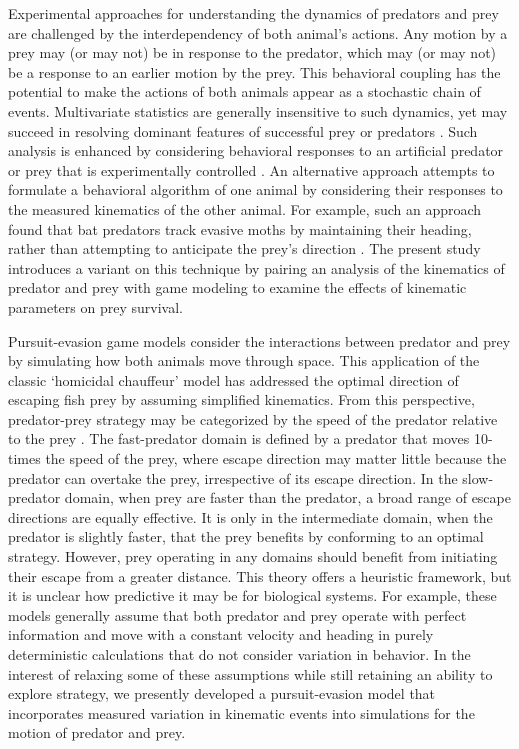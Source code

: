 \documentclass[]{rsos}%
\begin{document}
Experimental approaches for understanding the dynamics of predators and prey are challenged by the interdependency of both animal's actions.
Any motion by a prey may (or may not) be in response to the predator, which may (or may not) be a response to an earlier motion by the prey. 
This behavioral coupling has the potential to make the actions of both animals appear as a stochastic chain of events.
Multivariate statistics are generally insensitive to such dynamics, yet may succeed in resolving dominant features of successful prey \cite{Walker:2005vn} or predators \cite{Wainwright:2001ufa}.
Such analysis is enhanced by considering behavioral responses to an artificial predator or prey that is experimentally controlled \cite{Gabbiani:1999wz,Stewart:2014cma,Heuch:2007kk}.
An alternative approach attempts to formulate a behavioral algorithm of one animal by considering their responses to the measured kinematics of the other animal.
For example, such an approach found that bat predators track evasive moths by maintaining their heading, rather than attempting to anticipate the prey's direction \cite{Ghose:2006dk}. 
The present study introduces a variant on this technique by pairing an analysis of the kinematics of predator and prey with game modeling to examine the effects of kinematic parameters on prey survival.

Pursuit-evasion game models consider the interactions between predator and prey by simulating how both animals move through space.
This application of the classic `homicidal chauffeur' model \cite{Isaacs:1965uz} has addressed the optimal direction of escaping fish prey \cite{Weihs:1984tb} by assuming simplified kinematics.
From this perspective, predator-prey strategy may be categorized by the speed of the predator relative to the prey \cite{Soto:2015cj}. 
The fast-predator domain is defined by a predator that moves 10-times the speed of the prey, where escape direction may matter little because the predator can overtake the prey, irrespective of its escape direction.
In the slow-predator domain, when prey are faster than the predator, a broad range of escape directions are equally effective.
It is only in the intermediate domain, when the predator is slightly faster, that the prey benefits by conforming to an optimal strategy.
However, prey operating in any domains should benefit from initiating their escape from a greater distance.
This theory offers a heuristic framework, but it is unclear how predictive it may be for biological systems. 
For example, these models generally assume that both predator and prey operate with perfect information and move with a constant velocity and heading in purely deterministic calculations that do not consider variation in behavior.
In the interest of relaxing some of these assumptions while still retaining an ability to explore strategy, we presently developed a pursuit-evasion model that incorporates measured variation in kinematic events into simulations for the motion of predator and prey. 
\end{document}
